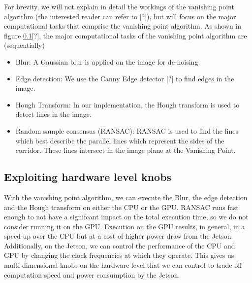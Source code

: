 For brevity, we will not explain in detail the workings of the vanishing point algorithm (the interested reader can refer to \cite{}[?]), but will focus on the major computational tasks that comprise the vanishing point algorithm. As shown in figure \ref{}[?], the major computational tasks of the vanishing point algorithm are (sequentially)

\begin{itemize}
\item Blur: A Gaussian blur is applied on the image for de-noising.
\item Edge detection: We use the Canny Edge detector \cite{}[?] to find edges in the image.
\item Hough Transform: In our implementation, the Hough transform is used to detect lines in the image.
\item Random sample consensus (RANSAC): RANSAC is used to find the lines which best describe the parallel lines which represent the sides of the corridor. These lines intersect in the image plane at the Vanishing Point.
\end{itemize}

\subsection{Exploiting hardware level knobs}
With the vanishing point algorithm, we can execute the Blur, the edge detection and the Hough transform on either the CPU or the GPU. RANSAC runs fast enough to not have a signifcant impact on the total execution time, so we do not consider running it on the GPU.
Execution on the GPU results, in general, in a speed-up over the CPU but at a cost of higher power draw from the Jetson. Additionally, on the Jetson, we can control the performance of the CPU and GPU by changing the clock frequencies at which they operate. This gives us multi-dimensional knobs on the hardware level that we can control to trade-off computation speed and power consumption by the Jetson.




